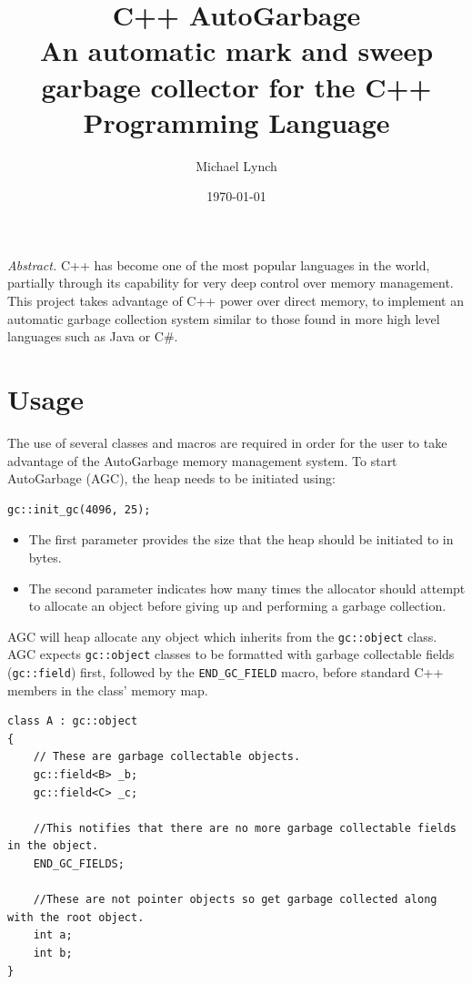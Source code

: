 \documentclass[11pt]{article}
\title{C++ AutoGarbage\\\medskip
\large An automatic mark and sweep garbage collector for the C++ Programming Language}
\author{Michael Lynch}
\date{\today}
\begin{document}
\begin{titlingpage}
\maketitle
\end{titlingpage}
\newpage

\vspace*{0.15\textheight}
\emph{Abstract.} C++ has become one of the most popular languages in the world, partially through its capability for
very deep control over memory management.
This project takes advantage of C++ power over direct memory, to implement an automatic garbage collection system
similar to those found in more high level languages such as Java or C\#.

\newpage
\tableofcontents
\newpage

\section{Usage}
The use of several classes and macros are required in order for the user to take advantage of the AutoGarbage memory 
management system. To start AutoGarbage (AGC), the heap needs to be initiated using:
\begin{lstlisting}
gc::init_gc(4096, 25);
\end{lstlisting}
\begin{itemize}
\item The first parameter provides the size that the heap should be initiated to in bytes.
\item The second parameter indicates how many times the allocator should attempt to allocate an object before giving
up and performing a garbage collection.
\end{itemize}

AGC will heap allocate any object which inherits from the \texttt{gc::object} class.
AGC expects \texttt{gc::object} classes to be formatted with garbage collectable fields (\texttt{gc::field})
first, followed by the \texttt{END\_GC\_FIELD} macro, before standard C++ members in the class' memory map.

\begin{lstlisting}[caption={Example Object}]
class A : gc::object
{
	// These are garbage collectable objects.
	gc::field<B> _b;
	gc::field<C> _c;
	
	//This notifies that there are no more garbage collectable fields in the object.
	END_GC_FIELDS;
	
	//These are not pointer objects so get garbage collected along with the root object.
	int a;
	int b;
}
\end{lstlisting}
\end{document}
